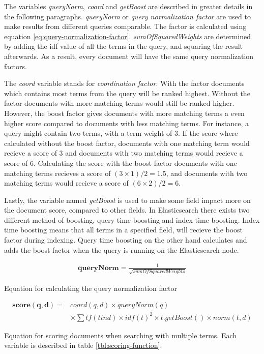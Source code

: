 The variables \textit{queryNorm}, \textit{coord} and \textit{getBoost} are described in greater details in the following paragraphs.
\textit{queryNorm} or \textit{query normalization factor} are used to make results from different queries comparable.
The factor is calculated using equation \ref{eq:query-normalization-factor}.
\textit{sumOfSquaredWeights} are determined by adding the idf value of all the terms in the query,
and squaring the result afterwards.
As a result, every document will have the same query normalization factors.

The \textit{coord} variable stands for \textit{coordination factor}.
With the factor documents which contains most terms from the query will be ranked highest.
Without the factor documents with more matching terms would still be ranked higher.
However, the boost factor gives documents with more matching terms a even higher score compared to documents with less matching terms.
For instance, a query might contain two terms, with a term weight of 3.
If the score where calculated without the boost factor,
documents with one matching term would recieve a score of 3 and documents with two matching terms would recieve a score of 6.
Calculating the score with the boost factor documents with one matching terms recieves a score of $(3 \times 1)/ 2 = 1.5$,
and documents with two matching terms would recieve a score of $(6 \times 2) / 2 = 6$.

Lastly, the variable named \textit{getBoost} is used to make some field impact more on the document score,
compared to other fields.
In Elasticsearch there exists two different method of boosting, query time boosting and index time boosting.
Index time boosting means that all terms in a specified field, will recieve the boost factor during indexing.
Query time boosting on the other hand calculates and adds the boost factor when the query is running on the Elasticsearch node.

\begin{cequation}
	\begin{equation}
		\begin{aligned}
			\mathbf{queryNorm} = \frac{1}{\sqrt{sumOfSquaredWeights}}
		\end{aligned}
	\end{equation}
	\caption{Equation for calculating the query normalization factor}
  \label{eq:query-normalization-factor}
\end{cequation}

\begin{cequation}
	\begin{equation}
		\begin{aligned}
			\mathbf{score(q,d)} = & coord(q,d) \times queryNorm(q) \\
														& \times \sum tf(t in d) \times idf(t)^2 \times t.getBoost() \times norm(t,d)
		\end{aligned}
	\end{equation}
	\caption{Equation for scoring documents when searching with multiple terms. Each variable is described in table \ref{tbl:scoring-function}.}
  \label{eq:scoring-function}
\end{cequation}


